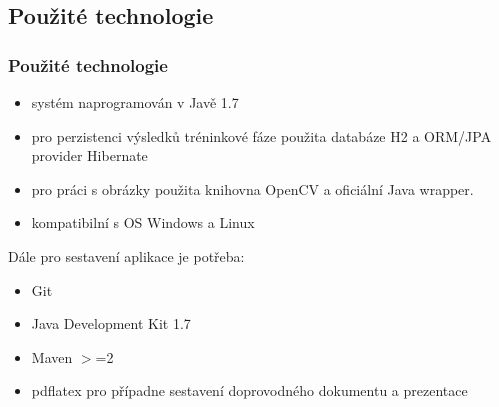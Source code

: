 \documentclass{beamer}
\begin{document}
\subsection{Použité technologie}
\begin{frame}
\frametitle{Použité technologie}

\begin{itemize}
	\item systém naprogramován v Javě 1.7
	\item pro perzistenci výsledků tréninkové fáze použita databáze H2 a ORM/JPA provider Hibernate
	\item pro práci s obrázky použita knihovna OpenCV a oficiální Java wrapper.
	\item kompatibilní s OS Windows a Linux
\end{itemize}

Dále pro sestavení aplikace je potřeba:

\begin{itemize}
		\item Git
		\item Java Development Kit 1.7
		\item Maven $>$=2
		\item pdflatex pro případne sestavení doprovodného dokumentu a prezentace
\end{itemize}

\end{frame}
\end{document}
